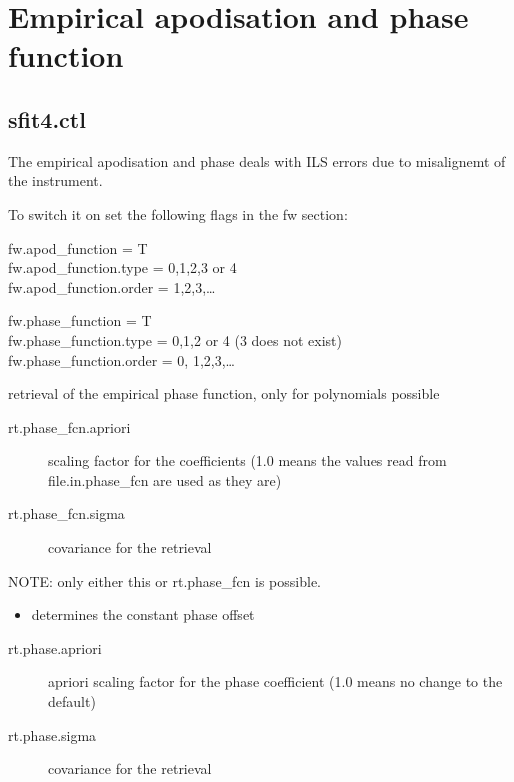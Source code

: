\documentclass[a4paper]{article}
\begin{document}
\section{Empirical apodisation and phase function}

\subsection{sfit4.ctl}

The empirical apodisation and phase deals with ILS errors due to
misalignemt of the instrument.

To switch it on set the following flags in the fw section:
\begin{description}
\item [fw.apod\_fcn] 
  fw.apod\_function = T\\
  fw.apod\_function.type = 0,1,2,3 or 4\\
  fw.apod\_function.order = 1,2,3,\ldots
\item [fw.phase\_fcn] 
  fw.phase\_function = T\\
  fw.phase\_function.type = 0,1,2 or 4 (3 does not exist)\\
  fw.phase\_function.order = 0, 1,2,3,\ldots\\
\item[rt.phase\_fcn = T ] retrieval of the empirical phase function, only
  for polynomials possible
  \begin{description}
  \item[rt.phase\_fcn.apriori] scaling factor for the coefficients
    (1.0 means the values read from file.in.phase\_fcn are used as
    they are)
  \item[rt.phase\_fcn.sigma] covariance for the retrieval 
  \end{description}
\item[rt.phase] NOTE: only either this or rt.phase\_fcn is possible.
  \begin{itemize}
  \item determines the constant phase offset
  \end{itemize}
  \begin{description}
  \item[rt.phase.apriori] apriori scaling factor for the phase coefficient (1.0 means no change to the default)
  \item[rt.phase.sigma] covariance for the retrieval 
  \end{description}
  \item 
\end{description}
\end{document}
